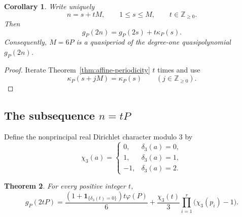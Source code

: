 \documentclass[12pt]{article}
\numberwithin{equation}{section}
\newtheorem{theorem}{Theorem}[section]
\newtheorem{corollary}[theorem]{Corollary}
\theoremstyle{definition}
\theoremstyle{remark}
\newcommand{\Z}{\mathbb Z}
\newcommand{\one}[1]{\mathbf 1_{\{#1\}}}
\begin{document}
\begin{corollary}
\label{cor:quasipolynomial}
Write uniquely
\[
n=s+tM,
\qquad
1\leq s\leq M,
\qquad
t\in\Z_{\geq0}.
\]
Then
\begin{equation}
\label{eq:quasipolynomial}
g_P(2n)
=
g_P(2s)+t\kappa_P(s).
\end{equation}
Consequently, $M=6P$ is a quasiperiod of the degree-one
quasipolynomial $g_P(2n)$.
\end{corollary}

\begin{proof}
Iterate Theorem~\ref{thm:affine-periodicity} $t$ times and use
\[
\kappa_P(s+jM)=\kappa_P(s)
\qquad
(j\in\Z_{\geq0}).
\]
\end{proof}

\subsection{The subsequence \texorpdfstring{$n=tP$}{n=tP}}

Define the nonprincipal real Dirichlet character modulo $3$ by
\begin{equation}
\label{eq:chi3-definition}
\chi_3(a)
=
\begin{cases}
0, & \delta_3(a)=0,\\
1, & \delta_3(a)=1,\\
-1, & \delta_3(a)=2.
\end{cases}
\end{equation}

\begin{theorem}
\label{thm:ray-formula}
For every positive integer $t$,
\begin{equation}
\label{eq:ray-formula}
g_P(2tP)
=
\frac{
\left(1+\one{\delta_3(t)=0}\right)t\varphi(P)
}{6}
+
\frac{\chi_3(t)}{3}
\prod_{i=1}^{r}
\bigl(\chi_3(p_i)-1\bigr).
\end{equation}
\end{theorem}
\end{document}
